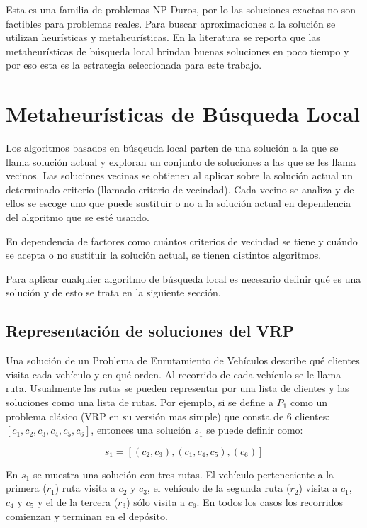 Esta es una familia de problemas NP-Duros\cite{TODO}, por lo las soluciones exactas no son factibles para problemas reales. Para buscar aproximaciones a la solución se utilizan heurísticas y metaheurísticas. En la literatura se reporta \cite{puede} que las metaheurísticas de búsqueda local brindan buenas soluciones en poco tiempo y por eso esta es la estrategia seleccionada para este trabajo. 

\section{Metaheurísticas de Búsqueda Local}\label{1-local}
Los algoritmos basados en búsqeuda local parten de una solución a la que se llama solución actual y exploran un conjunto de soluciones a las que se les llama vecinos. Las soluciones vecinas se obtienen al aplicar sobre la solución actual un determinado criterio (llamado criterio de vecindad). Cada vecino se analiza y de ellos se escoge uno que puede sustituir o no a la solución actual en dependencia del algoritmo que se esté usando. 

En dependencia de factores como cuántos criterios de vecindad se tiene y cuándo se acepta o no sustituir la solución actual, se tienen distintos algoritmos.

Para aplicar cualquier algoritmo de búsqueda local es necesario definir qué es una solución y de esto se trata en la siguiente sección.

\subsection{Representación de soluciones del VRP}\label{1-sol}
Una solución de un Problema de Enrutamiento de Vehículos describe qué clientes visita cada vehículo y en qué orden. Al recorrido de cada vehículo se le llama ruta. Usualmente las rutas se pueden representar por una lista de clientes y las soluciones como una lista de rutas. Por ejemplo, si se define a $P_1$ como un problema clásico (VRP en su versión mas simple) que consta de 6 clientes: $[c_1, c_2, c_3, c_4, c_5, c_6]$, entonces una solución $s_1$ se puede definir como:

\begin{equation}
	s_1 = [(c_2,c_3), (c_1,c_4,c_5), (c_6)]
\end{equation}

En $s_1$ se muestra una solución con tres rutas. El vehículo perteneciente a la primera ($r_1$) ruta visita a $c_2$ y $c_3$, el vehículo de la segunda ruta ($r_2$) visita a $c_1$, $c_4$ y $c_5$ y el de la tercera ($r_3$) sólo visita a $c_6$. En todos los casos los recorridos comienzan y terminan en el depósito.

